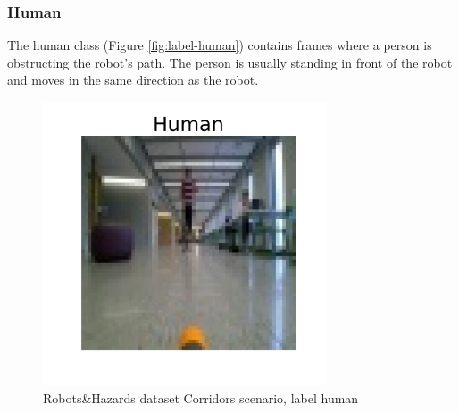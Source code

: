         \subsubsection*{Human}
            The human class (Figure \autoref{fig:label-human}) contains frames where a person is obstructing the robot's path. The person is usually standing in front of the robot and moves in the same direction as the robot.
            \begin{figure}[H]
                \centering
                \centerline{\includegraphics[width=0.75\textwidth]{img/labels/human.png}}
                \caption{Robots\&Hazards dataset Corridors scenario, label human}
                \label{fig:label-human}
            \end{figure}

